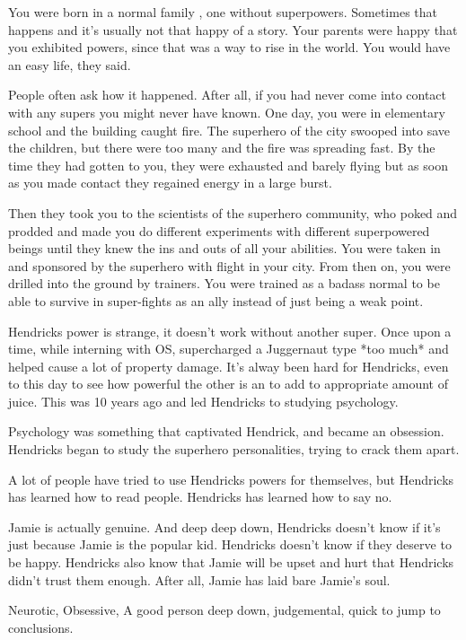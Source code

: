 \documentclass[char]{LRSguildcamp1}
\begin{document}
\name{\cYS{}}

You were born in a normal family , one without superpowers. Sometimes that happens and it's usually not that happy of a story. Your parents were happy that you exhibited powers, since that was a way to rise in the world. You would have an easy life, they said. 

People often ask how it happened. After all, if you had never come into contact with any supers you might never have known. One day, you were in elementary school and the building caught fire. The superhero of the city swooped into save the children, but there were too many and the fire was spreading fast. By the time they had gotten to you, they were exhausted and barely flying but as soon as you made contact they regained energy in a large burst. 

Then they took you to the scientists of the superhero community, who poked and prodded and made you do different experiments with different superpowered beings until they knew the ins and outs of all your abilities. You were taken in and sponsored by the superhero with flight in your city. From then on, you were drilled into the ground by trainers. You were trained as a badass normal to be able to survive in super-fights as an ally instead of just being a weak point.

Hendricks power is strange, it doesn’t work without another super. Once upon a time, while interning with OS, supercharged a Juggernaut type *too much* and helped cause a lot of property damage. It’s alway been hard for Hendricks, even to this day to see how powerful the other is an to add to appropriate amount of juice. This was 10 years ago and led Hendricks to studying psychology.  

Psychology was something that captivated Hendrick, and became an obsession. Hendricks began to study the superhero personalities, trying to crack them apart.

A lot of people have tried to use Hendricks powers for themselves, but Hendricks has learned how to read people. Hendricks has learned how to say no. 

Jamie is actually genuine. And deep deep down, Hendricks doesn’t know if it’s just because Jamie is the popular kid. Hendricks doesn’t know if they deserve to be happy. Hendricks also know that Jamie will be upset and hurt that Hendricks didn’t trust them enough. After all, Jamie has laid bare Jamie’s soul. 

Neurotic, Obsessive, A good person deep down, judgemental, quick to jump to conclusions. 
\end{document}
